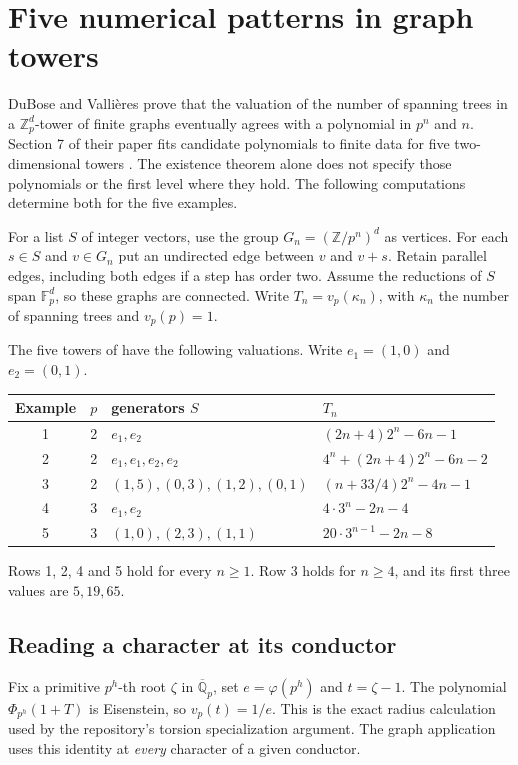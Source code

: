 \section{Five numerical patterns in graph towers}\label{sec:graphs}
DuBose and Vallières prove that the valuation of the number of spanning trees
in a $\mathbb Z_p^d$-tower of finite graphs eventually agrees with a polynomial
in $p^n$ and $n$. Section 7 of their paper fits candidate polynomials to finite
data for five two-dimensional towers \cite{DV}. The existence theorem alone
does not specify those polynomials or the first level where they hold.
The following computations determine both for the five examples.

For a list $S$ of integer vectors, use the group $G_n=(\mathbb Z/p^n)^d$ as
vertices. For each $s\in S$ and $v\in G_n$ put an undirected edge
between $v$ and $v+s$. Retain parallel edges, including both edges if a
step has order two. Assume the reductions of $S$ span $\mathbb F_p^d$,
so these graphs are connected. Write $T_n=v_p(\kappa_n)$, with $\kappa_n$
the number of spanning trees and $v_p(p)=1$.

\begin{theorem}\label{thm:five}The five towers of \cite[\S7]{DV}
have the following valuations. Write $e_1=(1,0)$ and $e_2=(0,1)$.
\begin{center}\small
\begin{tabular}{ccll}
\toprule
Example & $p$ & generators $S$ & $T_n$\\
\midrule
1 & 2 & $e_1,e_2$ & $(2n+4)2^n-6n-1$ \\
2 & 2 & $e_1,e_1,e_2,e_2$ & $4^n+(2n+4)2^n-6n-2$ \\
3 & 2 & $(1,5),(0,3),(1,2),(0,1)$ & $(n+33/4)2^n-4n-1$ \\
4 & 3 & $e_1,e_2$ & $4\cdot3^n-2n-4$ \\
5 & 3 & $(1,0),(2,3),(1,1)$ & $20\cdot3^{n-1}-2n-8$ \\
\bottomrule
\end{tabular}
\end{center}
Rows 1, 2, 4 and 5 hold for every $n\ge1$. Row 3 holds for $n\ge4$,
and its first three values are $5,19,65$.
\end{theorem}

\subsection{Reading a character at its conductor}
Fix a primitive $p^h$-th root $\zeta$ in $\overline{\mathbb Q}_p$, set
$e=\varphi(p^h)$ and $t=\zeta-1$. The polynomial $\Phi_{p^h}(1+T)$
is Eisenstein, so $v_p(t)=1/e$. This is the exact radius calculation used
by the repository's torsion specialization argument. The graph application
uses this identity at \emph{every} character of a given conductor.

